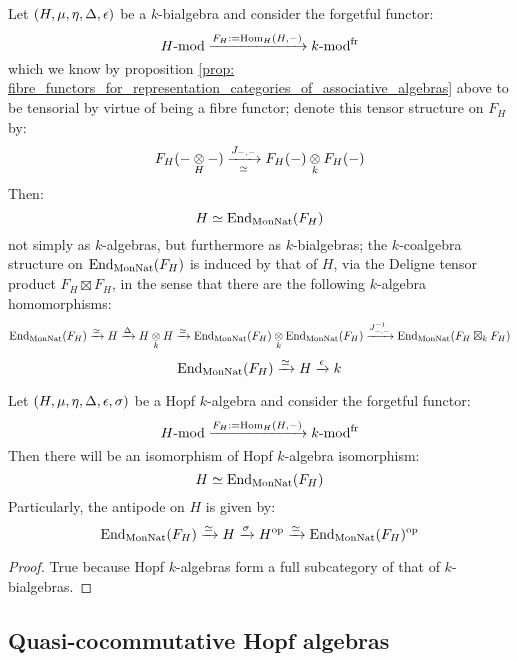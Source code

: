             \begin{proposition} \label{prop: fibre_functors_for_representation_categories_of_bialgebras}
                Let $(H, \mu, \eta, \Delta, \epsilon)$ be a $k$-bialgebra and consider the forgetful functor:
                    $$H\text{-}\mathrm{mod} \xrightarrow[]{F_H := \mathrm{Hom}_H(H, -)} k\text{-}\mathrm{mod}^{\mathrm{fr}}$$
                which we know by proposition \ref{prop: fibre_functors_for_representation_categories_of_associative_algebras} above to be tensorial by virtue of being a fibre functor; denote this tensor structure on $F_H$ by:
                    $$F_H(- \tensor_H -) \xrightarrow[\cong]{J_{-, -}} F_H(-) \tensor_k F_H(-)$$
                Then:
                    $$H \simeq \mathrm{End}_{\mathrm{Mon}\mathrm{Nat}}(F_H)$$
                not simply as $k$-algebras, but furthermore as $k$-bialgebras; the $k$-coalgebra structure on $\mathrm{End}_{\mathrm{Mon}\mathrm{Nat}}(F_H)$ is induced by that of $H$, via the Deligne tensor product $F_H \boxtimes F_H$, in the sense that there are the following $k$-algebra homomorphisms:
                    $$\End_{\Mon\Nat}(F_H) \xrightarrow[]{\cong} H \xrightarrow[]{\Delta} H \tensor_k H \xrightarrow[]{\cong} \End_{\Mon\Nat}(F_H) \tensor_k \End_{\Mon\Nat}(F_H) \xrightarrow[]{J_{-, -}^{-1}} \End_{\Mon\Nat}(F_H \boxtimes_k F_H)$$
                    $$\mathrm{End}_{\mathrm{Mon}\mathrm{Nat}}(F_H) \xrightarrow[]{\simeq} H \xrightarrow[]{\epsilon} k$$
            \end{proposition}
            \begin{corollary} \label{coro: fibre_functors_for_representation_categories_of_hopf_algebras}
                Let $(H, \mu, \eta, \Delta, \epsilon, \sigma)$ be a Hopf $k$-algebra and consider the forgetful functor:
                    $$H\text{-}\mathrm{mod} \xrightarrow[]{F_H := \mathrm{Hom}_H(H, -)} k\text{-}\mathrm{mod}^{\mathrm{fr}}$$
                Then there will be an isomorphism of Hopf $k$-algebra isomorphism:
                    $$H \simeq \mathrm{End}_{\mathrm{Mon}\mathrm{Nat}}(F_H)$$
                Particularly, the antipode on $H$ is given by:
                    $$\mathrm{End}_{\mathrm{Mon}\mathrm{Nat}}(F_H) \xrightarrow[]{\simeq} H \xrightarrow[]{\sigma} H^{\mathrm{op}} \xrightarrow[]{\simeq} \mathrm{End}_{\mathrm{Mon}\mathrm{Nat}}(F_H)^{\mathrm{op}}$$
            \end{corollary}
                \begin{proof}
                    True because Hopf $k$-algebras form a full subcategory of that of $k$-bialgebras. 
                \end{proof}
        
        \subsection{Quasi-cocommutative Hopf algebras}
        
